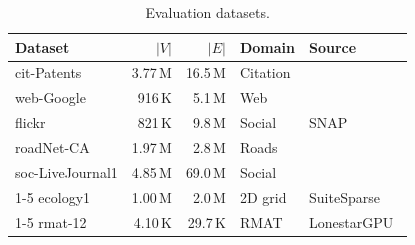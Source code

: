 \begin{table}[t]
  \caption{Evaluation datasets.}
  \label{tab:datasets}
  \centering
  \small
  \begin{tabular}{@{}lrrll@{}}
    \toprule
    \textbf{Dataset} & \textbf{$|V|$} & \textbf{$|E|$} & \textbf{Domain} & \textbf{Source} \\
    \midrule
    cit-Patents       & 3.77\,M & 16.5\,M & Citation       & \multirow{5}{*}{SNAP~\cite{leskovec2014snap}} \\
    web-Google        &  916\,K &  5.1\,M & Web            &                                                 \\
    flickr            &  821\,K &  9.8\,M & Social         &                                                 \\
    roadNet-CA        & 1.97\,M &  2.8\,M & Roads          &                                                 \\
    soc-LiveJournal1  & 4.85\,M & 69.0\,M & Social         &                                                 \\
    \cmidrule(lr){1-5}
    ecology1          & 1.00\,M &  2.0\,M & 2D grid        & SuiteSparse~\cite{davis2011suitesparse}        \\
    \cmidrule(lr){1-5}
    rmat-12           & 4.10\,K & 29.7\,K & RMAT           & LonestarGPU~\cite{burtscher2012irregular}      \\
    \bottomrule
  \end{tabular}
\end{table}
